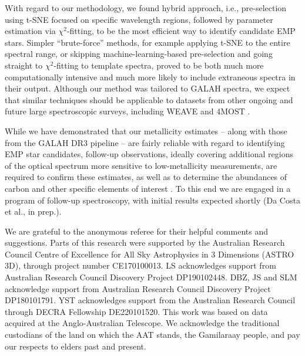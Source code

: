 \documentclass[]{aastex631}
\newcommand{\g}{GALAH\xspace}
\newcommand{\ts}{t-SNE\xspace}
\newcommand{\emp}{EMP star\xspace}
\newcommand{\emps}{EMP stars\xspace}
\newcommand{\ci}{$\chi^2$\xspace}
\begin{document}
With regard to our methodology, we found hybrid approach, i.e., pre-selection using \ts focused on specific wavelength regions, followed by parameter estimation via \ci-fitting, to be the most efficient way to identify candidate \emps. Simpler ``brute-force'' methods, for example applying \ts to the entire spectral range, or skipping machine-learning-based pre-selection and going straight to \ci-fitting to template spectra, proved to be both much more computationally intensive and much more likely to include extraneous spectra in their output. Although our method was tailored to \g spectra, we expect that similar techniques should be applicable to datasets from other ongoing and future large spectroscopic surveys, including WEAVE \citep{Dalton_2014} and 4MOST \citep{Jong20194MOSTPO}. 

While we have demonstrated that our metallicity estimates -- along with those from the \g DR3 pipeline -- are fairly reliable with regard to identifying \emp candidates, follow-up observations, ideally covering additional regions of the optical spectrum more sensitive to low-metallicity measurements, are required to confirm these estimates, as well as to determine the abundances of carbon and other specific elements of interest \citep[see, e.g.,][]{Beers2005, Frebel2015}. To this end we are engaged in a program of follow-up spectroscopy, with initial results expected shortly (Da Costa et al., in prep.).


\begin{acknowledgments}

We are grateful to the anonymous referee for their helpful comments and suggestions.
Parts of this research were supported by the Australian Research Council Centre of Excellence for All Sky Astrophysics in 3 Dimensions (ASTRO 3D), through project number CE170100013.  LS acknowledges support from  Australian Research Council Discovery Project DP190102448. DBZ, JS and SLM acknowledge support from Australian Research Council Discovery Project DP180101791. YST acknowledges support from the Australian Research Council through DECRA Fellowship DE220101520. This work was based on data acquired at the Anglo-Australian Telescope. We acknowledge the traditional custodians of the land on which the AAT stands, the Gamilaraay people, and pay our respects to elders past and present.

\vspace{5mm}


\end{acknowledgments}
\end{document}
